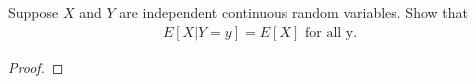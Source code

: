 \begin{problem}{3.10}
  Suppose $X$ and $Y$ are independent continuous random variables. Show that
  \begin{align*}
    E[X|Y=y] = E[X] \text{ for all y.}
  \end{align*}
\end{problem}

\begin{proof}
\end{proof}
\newpage
